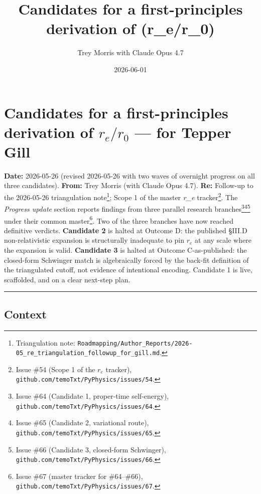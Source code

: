 \documentclass[
  11pt,
]{article}
\title{Candidates for a first-principles derivation of (r\_e/r\_0)}
\author{Trey Morris with Claude Opus 4.7}
\date{2026-06-01}
\begin{document}
\maketitle

\hypertarget{candidates-for-a-first-principles-derivation-of-r_er_0-for-tepper-gill}{%
\section{\texorpdfstring{Candidates for a first-principles derivation of
\(r_e/r_0\) --- for Tepper
Gill}{Candidates for a first-principles derivation of r\_e/r\_0 --- for Tepper Gill}}\label{candidates-for-a-first-principles-derivation-of-r_er_0-for-tepper-gill}}

\textbf{Date:} 2026-05-26 (revised 2026-05-26 with two waves of
overnight progress on all three candidates). \textbf{From:} Trey Morris
(with Claude Opus 4.7). \textbf{Re:} Follow-up to the 2026-05-26
triangulation note\footnote{Triangulation note:
  \texttt{Roadmapping/Author\_Reports/2026-05\_re\_triangulation\_followup\_for\_gill.md}.};
Scope 1 of the master \emph{r\_e} tracker\footnote{Issue \#54 (Scope 1
  of the \(r_e\) tracker),
  \texttt{github.com/temoTxt/PyPhysics/issues/54}.}. The \emph{Progress
update} section reports findings from three parallel research
branches\footnote{Issue \#64 (Candidate 1, proper-time self-energy),
  \texttt{github.com/temoTxt/PyPhysics/issues/64}.}\footnote{Issue \#65
  (Candidate 2, variational route),
  \texttt{github.com/temoTxt/PyPhysics/issues/65}.}\footnote{Issue \#66
  (Candidate 3, closed-form Schwinger),
  \texttt{github.com/temoTxt/PyPhysics/issues/66}.} under their common
master\footnote{Issue \#67 (master tracker for \#64--\#66),
  \texttt{github.com/temoTxt/PyPhysics/issues/67}.}. Two of the three
branches have now reached definitive verdicts. \textbf{Candidate 2} is
halted at Outcome D: the published §III.D non-relativistic expansion is
structurally inadequate to pin \(r_e\) at any scale where the expansion
is valid. \textbf{Candidate 3} is halted at Outcome C-as-published: the
closed-form Schwinger match is algebraically forced by the back-fit
definition of the triangulated cutoff, not evidence of intentional
encoding. Candidate 1 is live, scaffolded, and on a clear next-step
plan.

\begin{center}\rule{0.5\linewidth}{0.5pt}\end{center}

\hypertarget{context}{%
\subsection{Context}\label{context}}
\end{document}
